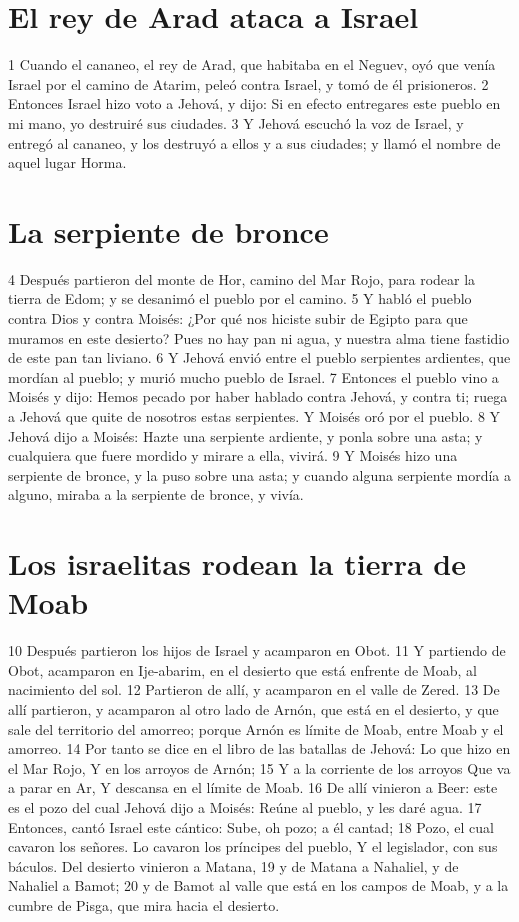 \section*{El rey de Arad ataca a Israel}


1 Cuando el cananeo, el rey de Arad, que habitaba en el Neguev, oyó que venía Israel  por el camino de Atarim, peleó contra Israel, y tomó de él prisioneros.
2 Entonces Israel hizo voto a Jehová, y dijo: Si en efecto entregares este pueblo en mi mano, yo destruiré sus ciudades.
3 Y Jehová escuchó la voz de Israel, y entregó al cananeo, y los destruyó a ellos y a sus ciudades; y llamó el nombre de aquel lugar Horma.
\section*{La serpiente de bronce }

4 Después partieron del monte de Hor, camino del Mar Rojo, para rodear la tierra de Edom; y se desanimó el pueblo por el camino.
5 Y habló el pueblo contra Dios y contra Moisés: ¿Por qué nos hiciste subir de Egipto para que muramos en este desierto? Pues no hay pan ni agua, y nuestra alma tiene fastidio de este pan tan liviano.
6 Y Jehová envió entre el pueblo serpientes ardientes, que mordían al pueblo; y murió mucho pueblo de Israel.
7 Entonces el pueblo vino a Moisés y dijo: Hemos pecado por haber hablado contra Jehová, y contra ti; ruega a Jehová que quite de nosotros estas serpientes. Y Moisés oró por el pueblo.
8 Y Jehová dijo a Moisés: Hazte una serpiente ardiente, y ponla sobre una asta; y cualquiera que fuere mordido y mirare a ella, vivirá.
9 Y Moisés hizo una serpiente de bronce, y la puso sobre una asta; y cuando alguna serpiente mordía a alguno, miraba a la serpiente de bronce, y vivía.
\section*{Los israelitas rodean la tierra de Moab}

10 Después partieron los hijos de Israel y acamparon en Obot.
11 Y partiendo de Obot, acamparon en Ije-abarim, en el desierto que está enfrente de Moab, al nacimiento del sol.
12 Partieron de allí, y acamparon en el valle de Zered.
13 De allí partieron, y acamparon al otro lado de Arnón, que está en el desierto, y que sale del territorio del amorreo; porque Arnón es límite de Moab, entre Moab y el amorreo.
14 Por tanto se dice en el libro de las batallas de Jehová:
Lo que hizo en el Mar Rojo,
Y en los arroyos de Arnón;
15 Y a la corriente de los arroyos
Que va a parar en Ar,
Y descansa en el límite de Moab. 
16 De allí vinieron a Beer: este es el pozo del cual Jehová dijo a Moisés: Reúne al pueblo, y les daré agua.
17 Entonces, cantó Israel este cántico:
Sube, oh pozo; a él cantad; 
18 Pozo, el cual cavaron los señores.
Lo cavaron los príncipes del pueblo,
Y el legislador, con sus báculos.
Del desierto vinieron a Matana, 
19 y de Matana a Nahaliel, y de Nahaliel a Bamot;
20 y de Bamot al valle que está en los campos de Moab, y a la cumbre de Pisga, que mira hacia el desierto.
